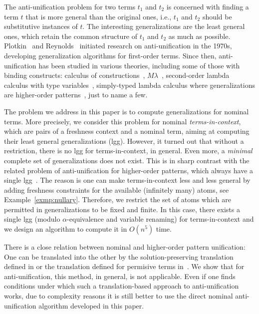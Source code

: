 \documentclass{llncs}
\begin{document}
The anti-unification problem for two terms $t_1$ and $t_2$ is
concerned with finding a term $t$ that is more general than the
original ones, i.e., $t_1$ and $t_2$ should be substitutive instances
of $t$. The interesting generalizations are the least general ones,
which retain the common structure of $t_1$ and $t_2$ as much as
possible. Plotkin~\cite{Plotkin70} and Reynolds~\cite{Reynolds70}
initiated research on anti-unification in the 1970s, developing
generalization algorithms for first-order terms. Since then,
anti-unification has been studied in various theories, including some
of those with binding constructs: calculus of
constructions~\cite{DBLP:conf/lics/Pfenning91},
$M\lambda$~\cite{DBLP:conf/icml/FengM92}, second-order lambda calculus
with type variables~\cite{DBLP:journals/amai/LuMHH00}, simply-typed
lambda calculus where generalizations are higher-order
patterns~\cite{DBLP:conf/rta/BaumgartnerKLV13}, just to name a few.

The problem we address in this paper is to compute generalizations for
nominal terms. More precisely, we consider this problem for nominal
\emph{terms-in-context}, which are pairs of a freshness context and a
nominal term, aiming at computing their least general generalizations
(lgg). However, it turned out that without a restriction, there is no
lgg for terms-in-context, in general. Even more, a \emph{minimal}
complete set of generalizations does not exist. This is in sharp
contrast with the related problem of anti-unification for higher-order
patterns, which always have a single
lgg~\cite{DBLP:conf/rta/BaumgartnerKLV13}. The reason is one can make
terms-in-context less and less general by adding freshness constraints
for the available (infinitely many) atoms, see
Example~\ref{exmp:nullary}.  Therefore, we restrict the set of atoms
which are permitted in generalizations to be fixed and finite. In this
case, there exists a single lgg (modulo $\alpha$-equivalence and
variable renaming) for terms-in-context and we design an algorithm to
compute it in $O(n^5)$ time.

There is a close relation between nominal and higher-order pattern
unification: One can be translated into the other by the
solution-preserving translation defined in \cite{cheney2005,
  DBLP:conf/rta/LevyV08, DBLP:journals/tocl/LevyV12} or the
translation defined for permisive terms
in~\cite{dowek09,DBLP:journals/igpl/DowekGM10}. We show that for
anti-unification, this method, in general, is not applicable.
Even if one finds conditions under which such a translation-based
approach to anti-unification works, due to complexity reasons it is
still better to use the direct nominal anti-unification algorithm
developed in this paper.
\end{document}
